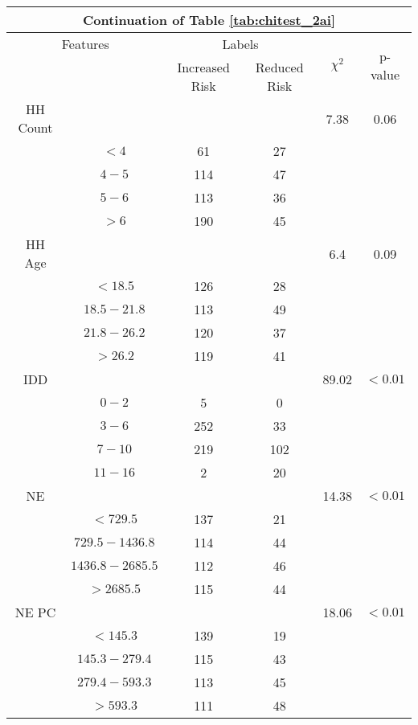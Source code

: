 \begin{table}
\centering
\label{tab:chitest_2ai_cont}
\begin{tabular}{c c | c c| c | c}
\hline
\multicolumn{6}{c}{Continuation of Table \ref{tab:chitest_2ai}}\\ 
\hline
\multicolumn{2}{c|}{Features}& \multicolumn{2}{c|}{Labels}& \multirow{2}{*}{$\chi^2$} & \multirow{2}{*}{p-value}\\ 
& & Increased Risk & Reduced Risk & & \\ 
\hline
HH Count &  &  & & 7.38 & 0.06 \\ 
& $< 4$ & 61 & 27& & \\ 
& $4-5$ & 114 & 47& & \\ 
& $5-6$ & 113 & 36& & \\ 
& $> 6$ & 190 & 45& & \\ 
\hline 
HH Age &  &  & & 6.4 & 0.09 \\ 
& $< 18.5$ & 126 & 28& & \\ 
& $18.5-21.8$ & 113 & 49& & \\ 
& $21.8-26.2$ & 120 & 37& & \\ 
& $> 26.2$ & 119 & 41& & \\ 
\hline 
IDD &  &  & & 89.02 & $< 0.01$ \\ 
& $0-2$ & 5 & 0& & \\ 
& $3-6$ & 252 & 33& & \\ 
& $7-10$ & 219 & 102& & \\ 
& $11-16$ & 2 & 20& & \\ 
\hline 
NE &  &  & & 14.38 & $< 0.01$ \\ 
& $< 729.5$ & 137 & 21& & \\ 
& $729.5-1436.8$ & 114 & 44& & \\ 
& $1436.8-2685.5$ & 112 & 46& & \\ 
& $> 2685.5$ & 115 & 44& & \\ 
\hline 
NE PC &  &  & & 18.06 & $< 0.01$ \\ 
& $< 145.3$ & 139 & 19& & \\ 
& $145.3-279.4$ & 115 & 43& & \\ 
& $279.4-593.3$ & 113 & 45& & \\ 
& $> 593.3$ & 111 & 48& & \\ 
\hline 
\end{tabular}
\end{table}

